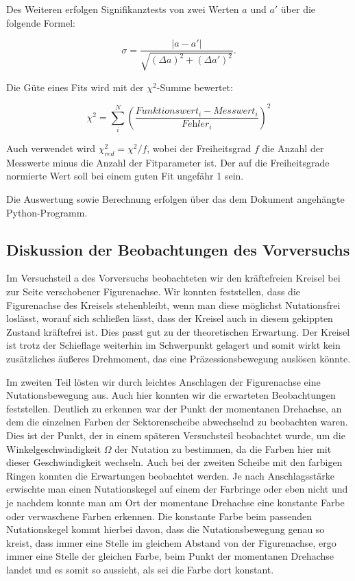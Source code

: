 \documentclass{article}
\begin{document}
Des Weiteren erfolgen Signifikanztests von zwei Werten $a$ und $a'$ über die folgende Formel:

\begin{equation}
    \sigma = \frac{|a-a'|}{\sqrt{(\Delta a)^2 + (\Delta a')^2}}.
\end{equation}

Die Güte eines Fits wird mit der $\chi^2$-Summe bewertet:

\begin{equation}
    \chi^2 = \sum_i^N \left( \frac{\textit{Funktionswert}_i - \textit{Messwert}_i}{\textit{Fehler}_i} \right)^2
\end{equation}

Auch verwendet wird $\chi^2_{red} = \chi^2 / f$, wobei der Freiheitsgrad $f$ die Anzahl der Messwerte minus die Anzahl der Fitparameter ist. Der auf die Freiheitsgrade normierte Wert soll bei einem guten Fit ungefähr 1 sein.

Die Auswertung sowie Berechnung erfolgen über das dem Dokument angehängte Python-Programm.

\newpage

\subsection{Diskussion der Beobachtungen des Vorversuchs}

Im Versuchsteil a des Vorversuchs beobachteten wir den kräftefreien Kreisel bei zur Seite verschobener Figurenachse. Wir konnten feststellen, dass die Figurenachse des Kreisels stehenbleibt, wenn man diese möglichst Nutationsfrei loslässt, worauf sich schließen lässt, dass der Kreisel auch in diesem gekippten Zustand kräftefrei ist. Dies passt gut zu der theoretischen Erwartung. Der Kreisel ist trotz der Schieflage weiterhin im Schwerpunkt gelagert und somit wirkt kein zusätzliches äußeres Drehmoment, das eine Präzessionsbewegung auslösen könnte. 

Im zweiten Teil lösten wir durch leichtes Anschlagen der Figurenachse eine Nutationsbewegung aus. Auch hier konnten wir die erwarteten Beobachtungen feststellen. Deutlich zu erkennen war der Punkt der momentanen Drehachse, an dem die einzelnen Farben der Sektorenscheibe abwechselnd zu beobachten waren. Dies ist der Punkt, der in einem späteren Versuchsteil beobachtet wurde, um die Winkelgeschwindigkeit $\Omega$ der Nutation zu bestimmen, da die Farben hier mit dieser Geschwindigkeit wechseln. Auch bei der zweiten Scheibe mit den farbigen Ringen konnten die Erwartungen beobachtet werden. Je nach Anschlagsstärke erwischte man einen Nutationskegel auf einem der Farbringe oder eben nicht und je nachdem konnte man am Ort der momentane Drehachse eine konstante Farbe oder verwaschene Farben erkennen. Die konstante Farbe beim passenden Nutationskegel kommt hierbei davon, dass die Nutationsbewegung genau so kreist, dass immer eine Stelle im gleichem Abstand von der Figurenachse, ergo immer eine Stelle der gleichen Farbe, beim Punkt der momentanen Drehachse landet und es somit so aussieht, als sei die Farbe dort konstant.
\end{document}
